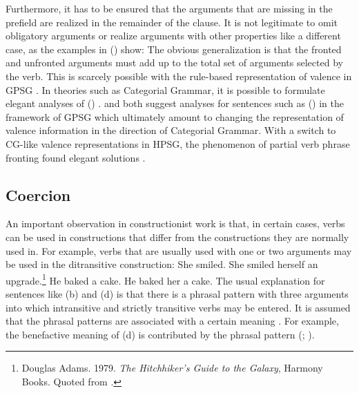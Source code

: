 \documentclass[output=paper
	        ,collection
	        ,collectionchapter
 	        ,biblatex
                ,babelshorthands
                ,newtxmath
                ,draftmode
                ,colorlinks, citecolor=brown
]{langscibook}
\begin{document}
Furthermore, it has to be ensured that the arguments that are
missing in the prefield are realized in the remainder of the clause. It is not legitimate to omit
obligatory arguments or realize arguments with other properties like a different case, as the
examples in () show:
\eal
{}
\zl
The obvious generalization is that the fronted and unfronted arguments must add up to the total
set of arguments selected by the verb. This is scarcely possible with the rule-based
representation of valence in GPSG \citep{Nerbonne86a,Johnson86a}. In theories such as Categorial
Grammar, it is possible to formulate elegant analyses of () 
\citep{Geach70a}. \citet{Nerbonne86a} and \citet{Johnson86a} both suggest analyses for sentences
such as () in the framework of GPSG which
ultimately amount to changing the representation of valence information in the direction of
Categorial Grammar.
With a switch to CG-like valence representations in HPSG, the phenomenon of partial verb phrase
fronting found elegant solutions \parencites[Section~4]{HoehleSpuren}{Mueller96a}{Meurers99a}.


\subsection{Coercion}
\label{sec-coercion}

An important observation in constructionist work is that, in certain cases, verbs can be used in
constructions that differ from the constructions they are normally used in. For example, verbs that are usually
used with one or two arguments may be used in the ditransitive construction:
\eal
\ex She smiled.
\ex She smiled herself an upgrade.\footnote{
Douglas Adams. 1979. \emph{The Hitchhiker’s Guide to the Galaxy}, Harmony Books. Quoted from
.
}
\ex He baked a cake.
\ex He baked her a cake.
\zl
The usual explanation for sentences like (b) and (d) is that there is a phrasal
pattern with three arguments into which intransitive and strictly transitive verbs may be
entered. It is assumed that the phrasal patterns are associated with a certain meaning \citep{Goldberg96a,GJ2004a}. For example,
the benefactive meaning of (d) is contributed by the phrasal pattern
(\citealt[Section~6]{Goldberg96a}; \citealt*[]{AGT2014a}).
\end{document}
